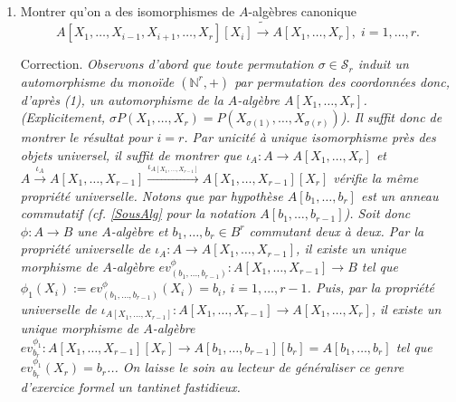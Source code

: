 \documentclass[a4paper, 12pt]{amsart}
\newcommand{\N}{\mathbb{N}}
\begin{document}
\begin{enumerate}[leftmargin=* ,parsep=0cm,itemsep=0cm,topsep=0cm]
\item Montrer qu'on a des isomorphismes de $A$-alg\`ebres canonique $$  A[X_1,\dots,X_{i-1},X_{i+1},\dots, X_r][X_i]\tilde{\rightarrow} A[X_1,\dots,X_r],\; i=1,\dots, r.$$

 \noindent  Correction. \textit{Observons d'abord que toute permutation $\sigma\in \mathcal{S}_r$ induit un automorphisme du mono\"{i}de $(\N^r,+)$ par permutation des coordonn\'ees donc, d'apr\`es (1), un automorphisme de la $A$-alg\`ebre $A[X_1,\dots, X_r]$. (Explicitement, $\sigma P(X_1,\dots, X_r)=P(X_{\sigma(1)},\dots, X_{\sigma(r)})$). Il suffit donc de montrer le r\'esultat pour $i=r$. Par unicit\'e  \`a unique isomorphisme pr\`es des objets universel, il suffit de montrer que 
$\iota_A:A\rightarrow A[X_1,\dots, X_r]$ et $A\stackrel{\iota_A}{\rightarrow} A[X_1,\dots, X_{r-1}]\stackrel{\iota_{A[X_1,\dots, X_{r-1}]}}{\rightarrow} A[X_1,\dots, X_{r-1}][X_r]$ v\'erifie la m\^eme propri\'et\'e universelle. Notons que par hypoth\`ese  $A[b_1,\dots ,b_r]$ est un anneau commutatif (\textit{cf.} \ref{SousAlg} pour la notation $A[b_1,\dots, b_{r-1}]$). Soit donc $\phi:A\rightarrow B$ une $A$-alg\`ebre et $b_1,\dots, b_r\in B^r$ commutant deux \`a deux. Par la propri\'et\'e universelle de $\iota_A:A\rightarrow A[X_1,\dots, X_{r-1}]$, il existe un unique morphisme de $A$-alg\`ebre $ev_{(b_1,\dots, b_{r-1})}^\phi:A[X_1,\dots,X_{r-1}]\rightarrow B$ tel que $\phi_1(X_i):=ev_{(b_1,\dots, b_{r-1})}^\phi(X_i)=b_i$, $i=1,\dots, r-1$. Puis, par la propri\'et\'e universelle de $\iota_{A[X_1,\dots, X_{r-1}]}:A[X_1,\dots, X_{r-1}]\rightarrow A[X_1,\dots, X_r]$, il existe un unique morphisme de $A$-alg\`ebre $ev_{b_r}^{\phi_1}:A[X_1,\dots,X_{r-1}][X_r]\rightarrow A[b_1,\dots ,b_{r-1}][b_r]=A[b_1,\dots,b_r]$ tel que $ev_{b_r}^{\phi_1}(X_r)=b_r$... On laisse le soin au lecteur de g\'en\'eraliser ce genre d'exercice formel un tantinet fastidieux.} \\
 
  \end{enumerate}
 
 

 
\end{document}

